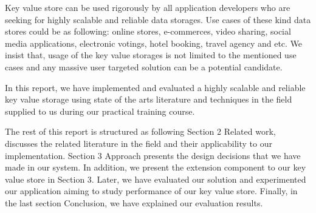 \documentclass{sig-alternate}
\begin{document}
Key value store can be used rigorously by all application developers who are seeking for highly scalable and reliable data storages. Use cases of these kind data stores could be as following: online stores, e-commerces, video sharing, social media applications, electronic votings, hotel booking, travel agency and etc. We insist that, usage of the key value storages is not limited to the mentioned use cases and any massive user targeted solution can be a potential candidate.

In this report, we have implemented and evaluated a highly scalable and reliable  key value storage using state of the arts literature and techniques in the field supplied to us during our practical training course. 

The rest of this report is structured as following Section 2 Related work, discusses the related literature in the field and their applicability to our implementation. Section 3 Approach presents the design decisions that we have made in our system. In addition, we present the extension component to our key value store in Section 3. Later, we have evaluated our solution and experimented our application aiming to study performance of our key value store.  Finally, in the last section Conclusion, we have explained our evaluation results.

%
%
\end{document}
